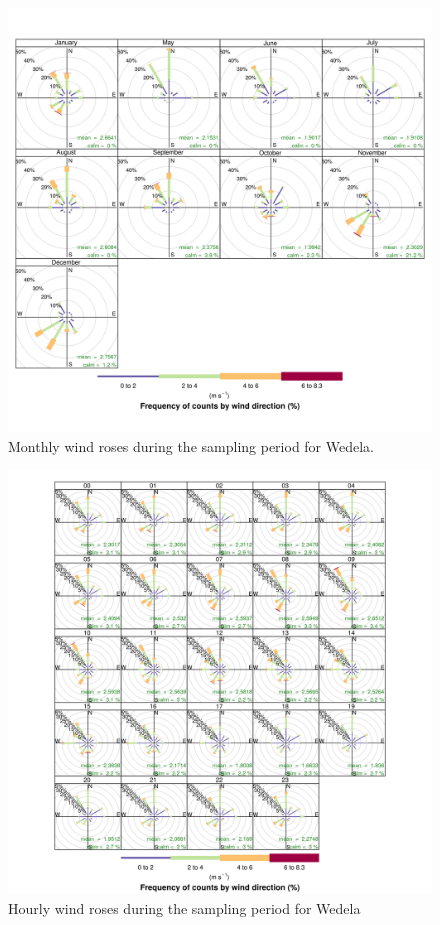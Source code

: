 \documentclass{nwureport}
\begin{document}
\begin{figure}[!htb]
    \centering
    \includegraphics[width=\textwidth]{images/Wedela-windrose-monthly.png}
    \caption[Monthly wind roses at Wedela.]{Monthly wind roses during the sampling period for Wedela.}
    \label{fig:windrose-monthly}
\end{figure}

\begin{figure}[!htb]
    \centering
    \includegraphics[width=\textwidth]{images/Wedela-windrose-hourly.png}
    \caption[Hourly wind roses for Wedela]{Hourly wind roses during the sampling period for Wedela}
    \label{fig:windrose-hourly}
\end{figure}
\end{document}
